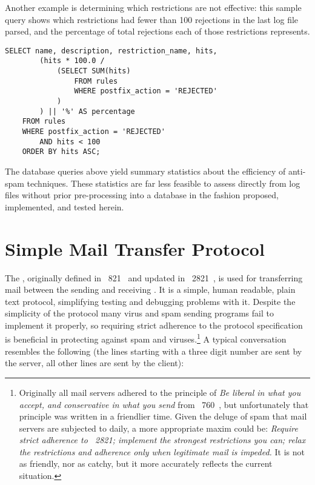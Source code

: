 Another example is determining which restrictions are not effective: this
sample query shows which restrictions had fewer than 100 rejections in the
last log file parsed, and the percentage of total rejections each of those
restrictions represents.

\begin{verbatim}
SELECT name, description, restriction_name, hits,
        (hits * 100.0 /
            (SELECT SUM(hits)
                FROM rules
                WHERE postfix_action = 'REJECTED'
            )
        ) || '%' AS percentage
    FROM rules
    WHERE postfix_action = 'REJECTED'
        AND hits < 100
    ORDER BY hits ASC;
\end{verbatim}

The database queries above yield summary statistics about the efficiency of
anti-spam techniques.  These statistics are far less feasible to assess
directly from log files without prior pre-processing into a database in the
fashion proposed, implemented, and tested herein.

\section{Simple Mail Transfer Protocol}

\label{SMTP background}

The , originally defined in ~821~\cite{RFC821}
and updated in ~2821~\cite{RFC2821}, is used for transferring
mail between the sending and receiving \@.  It is a simple,
human readable, plain text protocol, simplifying testing and debugging
problems with it.  Despite the simplicity of the protocol many virus and
spam sending programs fail to implement it properly, so requiring strict
adherence to the protocol specification is beneficial in protecting against
spam and viruses.\footnote{\label{footnote:rfc760}Originally all mail
servers adhered to the principle of \textit{Be liberal in what you accept,
and conservative in what you send\/} from ~760~\cite{rfc760},
but unfortunately that principle was written in a friendlier time.  Given
the deluge of spam that mail servers are subjected to daily, a more
appropriate maxim could be: \textit{Require strict adherence to
~2821; implement the strongest restrictions you can; relax the
restrictions and adherence only when legitimate mail is impeded.\/}  It is
not as friendly, nor as catchy, but it more accurately reflects the current
situation.} A typical  conversation resembles the following
(the lines starting with a three digit number are sent by the server, all
other lines are sent by the client):

